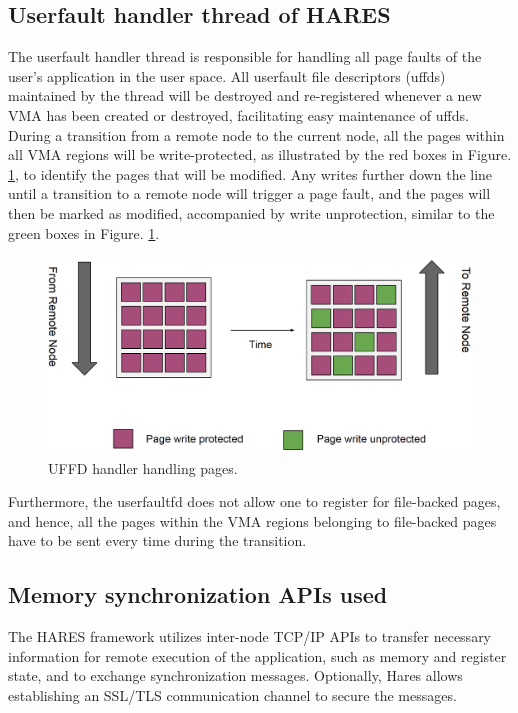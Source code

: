 \documentclass[article, doublespace,nopageskip]{VTthesis} %
\newcommand{\monitor}{HARES }
\begin{document}
    \subsection{Userfault handler thread of \monitor} \label{ase:userfaultfd handler}
    The userfault handler thread is responsible for handling all page faults of the user's application in the user space. All userfault file descriptors (uffds) maintained by the thread will be destroyed and re-registered whenever a new VMA has been created or destroyed, facilitating easy maintenance of uffds. During a transition from a remote node to the current node, all the pages within all VMA regions will be write-protected, as illustrated by the red boxes in Figure. \ref{fig:uffd_handler}, to identify the pages that will be modified. Any writes further down the line until a transition to a remote node will trigger a page fault, and the pages will then be marked as modified, accompanied by write unprotection, similar to the green boxes in Figure. \ref{fig:uffd_handler}.

    \begin{figure}[htb]
        \centering
        \includegraphics[scale=0.7]{figures/uffd_handler.png}
        \caption{UFFD handler handling pages.} 
        \label{fig:uffd_handler}
    \end{figure}

    Furthermore, the userfaultfd does not allow one to register for file-backed pages, and hence, all the pages within the VMA regions belonging to file-backed pages have to be sent every time during the transition. 
    
    \subsection{Memory synchronization APIs used} \label{ase:memsync_api}
    The \monitor framework utilizes inter-node TCP/IP APIs to transfer necessary information for remote execution of the application, such as memory and register state, and to exchange synchronization messages. Optionally, Hares allows establishing an SSL/TLS communication channel to secure the messages. 
\end{document}

